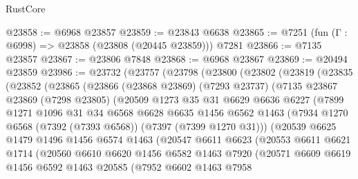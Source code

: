\begin{lexlean}{RustCore}
\begin{coremodule}
@23858 := @6968 @23857
@23859 := @23843 @6638
@23865 := @7251 (fun (Γ : @6998) => @23858 (@23808 (@20445 @23859))) @7281
@23866 := @7135 @23857
@23867 := @23806 @7848
@23868 := @6968 @23867
@23869 := @20494 @23859
@23986 := @23732
    (@23757
      (@23798
        (@23800
          (@23802
            (@23819
              (@23835
                (@23852
                  (@23865
                    (@23866
                      (@23868 @23869)
                      (@7293 @23737)
                      (@7135
                        @23867
                        @23869
                        (@7298 @23805)
                        (@20509
                          @1273
                          @35
                          @31
                          @6629
                          @6636
                          @6227
                          (@7899
                            @1271
                            @1096
                            @31
                            @34
                            @6568
                            @6628
                            @6635
                            @1456
                            @6562
                            @1463
                            (@7934 @1270 @6568 (@7392 (@7393 @6568)) (@7397 (@7399 @1270 @31)))
                            (@20539
                              @6625
                              @1479
                              @1496
                              @1456
                              @6574
                              @1463
                              (@20547
                                @6611
                                @6623
                                (@20553
                                  @6611
                                  @6621
                                  @1714
                                  (@20560
                                    @6610
                                    @6620
                                    @1456
                                    @6582
                                    @1463
                                    @7920
                                    (@20571
                                      @6609
                                      @6619
                                      @1456
                                      @6592
                                      @1463
                                      @20585
                                      (@7952
                                        @6602
                                        @1463
                                        @7958

\end{coremodule}
\end{lexlean}
